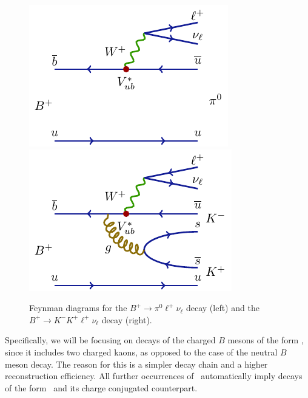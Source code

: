 \begin{figure}[H]
\centering
\includegraphics{texfig/B2pilnu}
\hspace{1cm}
\includegraphics{texfig/B2KKlnu}
\caption{Feynman diagrams for the $B^+ \to \pi^0 \ell^+ \nu_\ell$ decay (left) and the $B^+ \to K^- K^+ \ell^+ \nu_\ell$ decay (right).}
\label{feynman}
\end{figure}

Specifically, we will be focusing on decays of the charged $B$ mesons of the form \decayb, since it includes two charged kaons, as opposed to the case of the neutral $B$ meson decay. The reason for this is a simpler decay chain and a higher reconstruction efficiency. All further occurrences of \decaya~automatically imply decays of the form \decayb~and its charge conjugated counterpart.